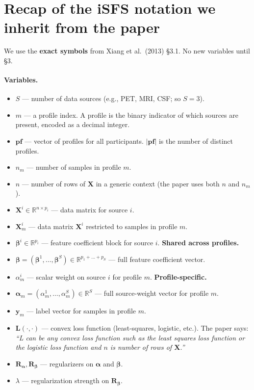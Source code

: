 \documentclass[11pt,a4paper]{article}
\begin{document}
\newpage
\tableofcontents
\newpage

\section{Recap of the iSFS notation we inherit from the paper}

We use the \textbf{exact symbols} from Xiang et al.\ (2013) \S 3.1. No new variables until \S 3.

\paragraph{Variables.}
\begin{itemize}[leftmargin=*,itemsep=2pt]
  \item $S$ --- number of data sources (e.g., PET, MRI, CSF; so $S = 3$).
  \item $m$ --- a profile index. A profile is the binary indicator of which sources are present, encoded as a decimal integer.
  \item $\mathbf{pf}$ --- vector of profiles for all participants. $|\mathbf{pf}|$ is the number of distinct profiles.
  \item $n_m$ --- number of samples in profile $m$.
  \item $n$ --- number of rows of $\mathbf{X}$ in a generic context (the paper uses both $n$ and $n_m$).
  \item $\mathbf{X}^i \in \mathbb{R}^{n \times p_i}$ --- data matrix for source $i$.
  \item $\mathbf{X}^i_m$ --- data matrix $\mathbf{X}^i$ restricted to samples in profile $m$.
  \item $\boldsymbol{\beta}^i \in \mathbb{R}^{p_i}$ --- feature coefficient block for source $i$. \textbf{Shared across profiles.}
  \item $\boldsymbol{\beta} = (\boldsymbol{\beta}^1, \ldots, \boldsymbol{\beta}^S) \in \mathbb{R}^{p_1 + \ldots + p_S}$ --- full feature coefficient vector.
  \item $\alpha^i_m$ --- scalar weight on source $i$ for profile $m$. \textbf{Profile-specific.}
  \item $\boldsymbol{\alpha}_m = (\alpha^1_m, \ldots, \alpha^S_m) \in \mathbb{R}^S$ --- full source-weight vector for profile $m$.
  \item $\mathbf{y}_m$ --- label vector for samples in profile $m$.
  \item $\mathbf{L}(\cdot, \cdot)$ --- convex loss function (least-squares, logistic, etc.). The paper says: \emph{``L can be any convex loss function such as the least squares loss function or the logistic loss function and $n$ is number of rows of $\mathbf{X}$.''}
  \item $\mathbf{R}_{\boldsymbol{\alpha}}, \mathbf{R}_{\boldsymbol{\beta}}$ --- regularizers on $\boldsymbol{\alpha}$ and $\boldsymbol{\beta}$.
  \item $\lambda$ --- regularization strength on $\mathbf{R}_{\boldsymbol{\beta}}$.
\end{itemize}
\end{document}
